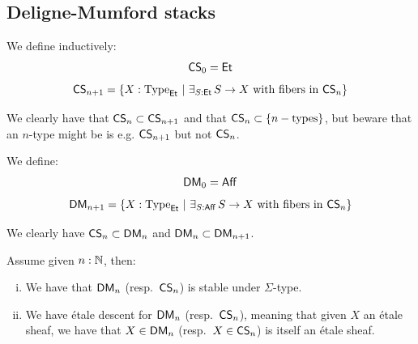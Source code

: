 \subsection{Deligne-Mumford stacks}

\begin{definition}
We define inductively:
\[\mathsf{CS}_0 = \mathsf{Et}\]
\[\CS_{n+1} = \{X:\Type_\Et\ |\ \exists_{S:\Et}\, S\to X\ \mathrm{with\ fibers\ in}\ \CS_n\}\]
\end{definition}

\begin{remark}
We clearly have that $\mathsf{CS}_n\subset \mathsf{CS}_{n+1}$ and that $\mathsf{CS}_n\subset\{n-\mathrm{types}\}$, but beware that an $n$-type might be is e.g. $\mathsf{CS}_{n+1}$ but not $\mathsf{CS}_n$.
\end{remark}

\begin{definition}
We define:
\[\mathsf{DM}_0 = \mathsf{Aff}\]
\[\mathsf{DM}_{n+1} = \{X:\mathrm{Type}_{\mathsf{Et}}\ |\ \exists_{S:\mathsf{Aff}}\, S\to X\ \mathrm{with\ fibers\ in}\ \mathsf{CS}_n\}\]
\end{definition}

\begin{remark}
We clearly have $\mathsf{CS}_n\subset\mathsf{DM}_n$ and $\mathsf{DM}_n\subset \mathsf{DM}_{n+1}$.
\end{remark}

\begin{lemma}\label{CSn-DMn-stability}
Assume given $n:\mathbb{N}$, then:

\begin{enumerate}[(i)]
\item We have that $\mathsf{DM}_n$ (resp.\ $\mathsf{CS}_n$) is stable under $\Sigma$-type.
\item We have étale descent for $\mathsf{DM}_n$ (resp.\ $\mathsf{CS}_n$), meaning that given $X$ an étale sheaf, we have that $X\in \mathsf{DM}_n$ (resp.\ $X\in\mathsf{CS}_n$) is itself an étale sheaf.
\end{enumerate}
\end{lemma}

